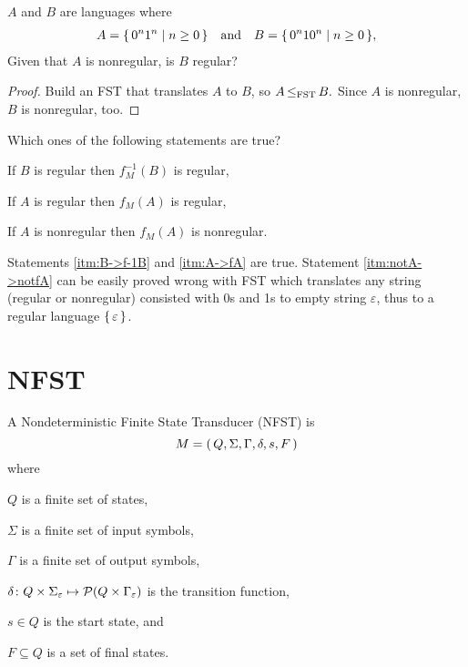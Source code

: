 
\begin{example}

    $A$ and $B$ are languages where
    \begin{align*}
        A = { \left\{\, 0^n 1^n \mid n \ge 0 \,\right\} } \quad \text{and} \quad
        B = { \left\{\, 0^n 1 0^n \mid n \ge 0 \,\right\} }
    ,\end{align*}
    Given that $A$ is nonregular, is $B$ regular?

    \begin{proof}
        Build an FST that translates $A$ to $B$,
        so 
        $
        A { \,\le_{\text{\upshape FST}}\, } B
        .$
        Since $A$ is nonregular,
        $B$ is nonregular, too.
    \end{proof}

\end{example}

\begin{example}
    Which ones of the following statements are true?
    \begin{compactenum}
    \item If $B$ is regular then $f_M^{-1}(B)$ is regular, \label{itm:B->f-1B} 
    \item If $A$ is regular then $f_M(A)$ is regular, \label{itm:A->fA}
    \item If $A$ is nonregular then $f_M(A)$ is nonregular. \label{itm:notA->notfA}
    \end{compactenum}

    Statements \ref{itm:B->f-1B} and \ref{itm:A->fA} are true.
    Statement \ref{itm:notA->notfA} can be easily proved wrong with FST
    which translates any string (regular or nonregular) consisted with 0s and 1s to empty
    string $\varepsilon$, thus to a regular language ${ \left\{\,\varepsilon\,\right\} }$.
\end{example}

\section{NFST}

\begin{definition}[NFST]
    A Nondeterministic Finite State Transducer (NFST) is 
    \[
        M = { \left(\,Q,\Sigma,\Gamma,\delta,s,F\,\right) }
    \]
    where
    \begin{compactenum}
    \item $Q$      is a finite set of states,
    \item $\Sigma$ is a finite set of input  symbols,
    \item $\Gamma$ is a finite set of output symbols,
    \item 
        $
        \delta \colon
        Q \times \Sigma_\varepsilon \mapsto
        { \mathcal{P} }(Q \times \Gamma_\varepsilon)
        $
        is the transition function,
    \item $s \in Q$ is the start state, and
    \item $F \subseteq Q$ is a set of final states.
    \end{compactenum}
\end{definition}

